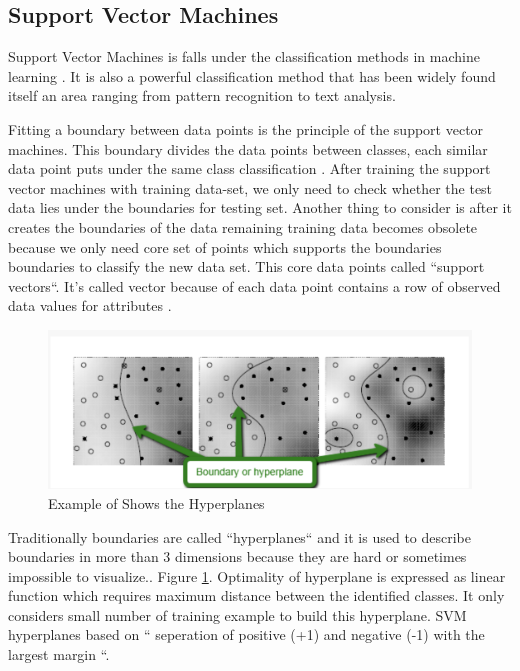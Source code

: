\documentclass[sigconf]{acmart}
\begin{document}
\subsection{Support Vector Machines}
Support Vector Machines is falls under the classification methods in machine learning \cite{www-simafore-svm}. It is also a powerful classification method that has been widely found itself an area ranging from pattern recognition to text analysis\cite{www-simafore-svm}. 
\par Fitting a boundary between data points is the principle of the support vector machines. This boundary divides the data points between classes, each similar data point puts under the same class classification \cite{www-simafore-svm}. After training the support vector machines with training data-set, we only need to check whether the test data lies under the boundaries for testing set. Another thing to consider is after it creates the boundaries of the data remaining training data becomes obsolete because we only need core set of points which supports the boundaries boundaries to classify the new data set. This core data points called ``support vectors``. It's called vector because of each data point contains a row of observed data values for attributes \cite{www-simafore-svm}. 

 \begin{figure}[!ht]
  \centering
      \includegraphics[width=\columnwidth]{project/images/hyperplane-boundary.png}
  \caption{Example of Shows the Hyperplanes \cite{www-simafore-svm}}\label{fig:Hyperplane}
\end{figure}

\par Traditionally boundaries are called ``hyperplanes`` and it is used to describe boundaries in more than 3 dimensions because they are hard or sometimes impossible to visualize.\cite{www-simafore}. Figure \ref{fig:Hyperplane}. Optimality of hyperplane is expressed as linear function which requires maximum distance between the identified classes. It only considers small number of training example to build this hyperplane. SVM hyperplanes based on `` seperation of positive (+1) and negative (-1) with the largest margin \cite{verma-ssv}``.
\end{document}
